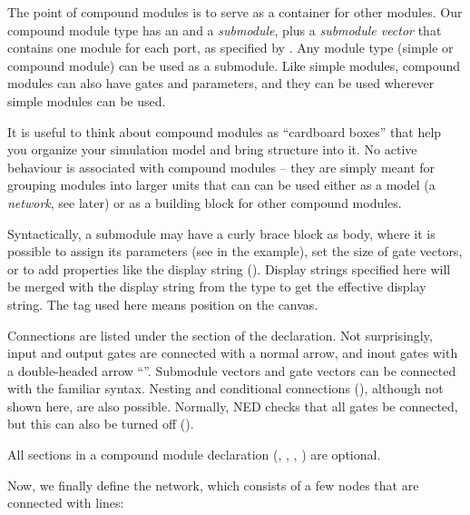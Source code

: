 The point of compound modules is to serve as a container for other
modules. Our  compound module type has an  and
a  \textit{submodule}, plus a  \textit{submodule vector}
that contains one  module for each port, as specified by
.
Any module type (simple or compound module) can be used as a submodule.
Like simple modules, compound modules can also have gates and parameters,
and they can be used wherever simple modules can be used.

It is useful to think about compound modules as ``cardboard boxes''
that help you organize your simulation model and bring structure into
it. No active behaviour is associated with compound modules -- they
are simply meant for grouping modules into larger units that can
can be used either as a model (a \textit{network}, see later)
or as a building block for other compound modules.

Syntactically, a submodule may have a curly brace block as body, where
it is possible to assign its parameters (see  in the example),
set the size of gate vectors, or to add properties like the display string
(). Display strings specified here will be merged with the
display string from the type to get the effective display string.
The  tag used here means position on the canvas.

Connections are listed under the  section of the
declaration. Not surprisingly, input and output gates are
connected with a normal arrow, and inout gates with a double-headed
arrow ``\ttt{<-->}''. Submodule vectors and gate vectors can be
connected with the familiar  syntax. Nesting and conditional
connections (), although not shown here, are also possible.
Normally, NED checks that all gates be connected, but this can also
be turned off ().

All sections in a compound module declaration (,
, , ) are optional.

Now, we finally define the network, which consists of a few nodes that
are connected with lines:

